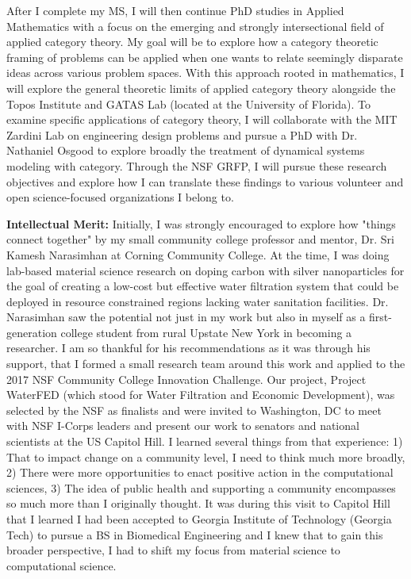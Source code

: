 \documentclass[11pt]{extarticle}
\begin{document}
After I complete my MS, I will then continue PhD studies in Applied Mathematics with a focus on the emerging and strongly intersectional field of applied category theory.
My goal will be to explore how a category theoretic framing of problems can be applied when one wants to relate seemingly disparate ideas across various problem spaces.
With this approach rooted in mathematics, I will explore the general theoretic limits of applied category theory alongside the Topos Institute and GATAS Lab (located at the University of Florida).
To examine specific applications of category theory, I will collaborate with the MIT Zardini Lab on engineering design problems and pursue a PhD with Dr. Nathaniel Osgood to explore broadly the treatment of dynamical systems modeling with category.
Through the NSF GRFP, I will pursue these research objectives and explore how I can translate these findings to various volunteer and open science-focused organizations I belong to.

\textbf{Intellectual Merit:} Initially, I was strongly encouraged to explore how "things connect together" by my small community college professor and mentor, Dr. Sri Kamesh Narasimhan at Corning Community College.
At the time, I was doing lab-based material science research on doping carbon with silver nanoparticles for the goal of creating a low-cost but effective water filtration system that could be deployed in resource constrained regions lacking water sanitation facilities.
Dr. Narasimhan saw the potential not just in my work but also in myself as a first-generation college student from rural Upstate New York in becoming a researcher.
I am so thankful for his recommendations as it was through his support, that I formed a small research team around this work and applied to the 2017 NSF Community College Innovation Challenge.
Our project, Project WaterFED (which stood for Water Filtration and Economic Development), was selected by the NSF as finalists and were invited to Washington, DC to meet with NSF I-Corps leaders and present our work to senators and national scientists at the US Capitol Hill.
I learned several things from that experience: 1) That to impact change on a community level, I need to think much more broadly, 2) There were more opportunities to enact positive action in the computational sciences, 3) The idea of public health and supporting a community encompasses so much more than I originally thought.
It was during this visit to Capitol Hill that I learned I had been accepted to Georgia Institute of Technology (Georgia Tech) to pursue a BS in Biomedical Engineering and I knew that to gain this broader perspective, I had to shift my focus from material science to computational science.
\end{document}
